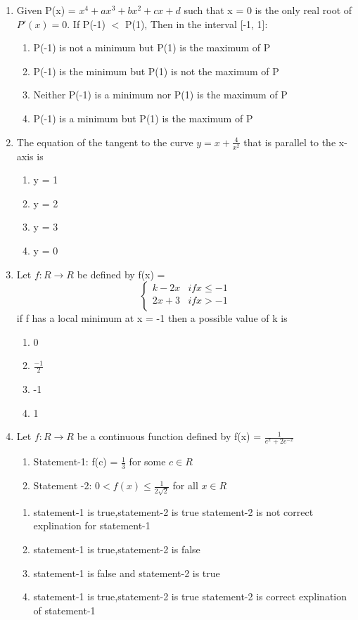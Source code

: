 \begin{enumerate}[label=\arabic*.,ref=\thesubsection.\theenumi]
\item Given P(x) = $x^4 + ax^3 + bx^2 + cx + d$ such that x = 0 is the only real root of $P'(x)=0$. If P(-1) $<$ P(1), Then in the interval [-1, 1]:
\begin{enumerate}
\item P(-1) is not a minimum but P(1) is the maximum of P
\item P(-1) is the minimum but P(1) is  not the maximum of P
\item Neither P(-1) is a minimum nor P(1) is the maximum of P
\item P(-1) is a minimum but P(1) is the maximum of P
\end{enumerate}

\item The equation of the tangent to the curve $y = x + \frac{4}{x^2}$ that is parallel to the x-axis is 
\begin{enumerate}
\item y = 1
\item y = 2
\item y = 3
\item y = 0
\end{enumerate}

\item Let $f: R \to R$ be defined by f(x) = 
\[ \begin{cases} 
      k - 2x &  if x \leq -1 \\
      2x + 3 & if x > -1\\
      \end{cases}
\] 
if f has a local minimum at x = -1 then a possible value of k is 
\begin{enumerate}
\item 0
\item $\frac{-1}{2}$
\item -1
\item 1
\end{enumerate}

\item Let $f: R \to R$ be a continuous function defined by f(x) = $\frac{1}{e^x + 2e^{-x}}$
\begin{enumerate}
\item Statement-1: f(c) = $\frac{1}{3}$ for some $c \in R$
\item Statement -2: $0 < f(x) \leq \frac{1}{2\sqrt{2}}$ for all $x \in R$
\end{enumerate}
\begin{enumerate}
\item statement-1 is true,statement-2 is true statement-2 is not correct explination for statement-1
\item statement-1 is true,statement-2 is false 
\item statement-1 is false and statement-2 is true 
\item statement-1 is true,statement-2 is true statement-2 is correct explination of statement-1
\end{enumerate}


\end{enumerate}
